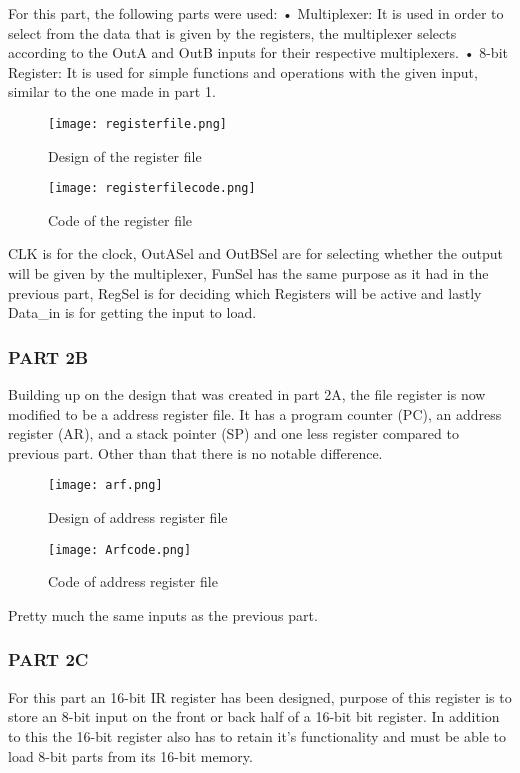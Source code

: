 \documentclass[pdftex,12pt,a4paper]{article}
\begin{document}
\begin{itemize}
For this part, the following parts were used:
\singlespacing
• Multiplexer: It is used in order to select from the data that is given by the registers, the multiplexer selects according to the OutA and OutB inputs for their respective multiplexers.
\singlespacing
• 8-bit Register: It is used for simple functions and operations with the given input, similar to the one made in part 1.
\singlespacing


\begin{figure}[H]
	\centering
	\texttt{[image: registerfile.png]}	
	\caption{Design of the register file}
	\label{fig1-1}
\end{figure}

\begin{figure}[H]
	\centering
	\texttt{[image: registerfilecode.png]}	
	\caption{Code of the register file}
	\label{fig1-1}
\end{figure}

CLK is for the clock, OutASel and OutBSel are for selecting whether the output will be given by the multiplexer, FunSel has the same purpose as it had in the previous part, RegSel is for deciding which Registers will be active and lastly Data_in is for getting the input to load.

\singlespacing


\subsubsection{PART 2B}
Building up on the design that was created in part 2A, the file register is now modified to be a address register file. It has a program counter (PC), an address register (AR), and a stack pointer (SP) and one less register compared to previous part. Other than that there is no notable difference.

\begin{figure}[H]
	\centering
	\texttt{[image: arf.png]}	
	\caption{Design of address register file}
	\label{fig1-1}
\end{figure}

\begin{figure}[H]
	\centering
	\texttt{[image: Arfcode.png]}
	\caption{Code of address register file}
	\label{fig1-1}
\end{figure}
\singlespacing

Pretty much the same inputs as the previous part.

\subsubsection{PART 2C}
For this part an 16-bit IR register has been designed, purpose of this register is to store an 8-bit input on the front or back half of a 16-bit bit register. In addition to this the 16-bit register also has to retain it's functionality and must be able to load 8-bit parts from its 16-bit memory.


\end{itemize}
\end{document}
